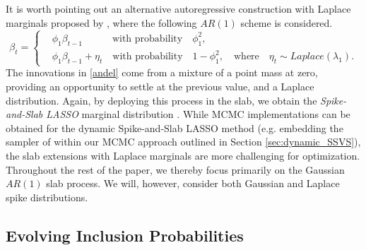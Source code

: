 \documentclass[ba]{imsart}
\numberwithin{equation}{section}
\theoremstyle{plain}
\def\C {\,|\:}
\def\C {\,|\:}
\begin{document}
It is worth pointing out an alternative autoregressive construction with Laplace marginals proposed  by \cite{andel}, {where  the following $AR(1)$ scheme is considered.}
\begin{equation}\label{andel}
\beta_t=\begin{cases}
&\phi_1\beta_{t-1} \quad \quad\quad\text{with probability}\quad \phi_1^2,\\
&\phi_1\beta_{t-1}+\eta_t\quad \text{with probability}\quad 1-\phi_1^2, \quad\text{where}\quad\eta_t\sim Laplace(\lambda_1).
\end{cases}
\end{equation}
The innovations in \eqref{andel} come from a mixture of a point mass at zero, providing an opportunity to settle at the previous value, and a Laplace distribution. Again, {by} deploying this process in  the slab, we  obtain the {\sl Spike-and-Slab LASSO} marginal distribution \citep{rockova15}.  While MCMC implementations can be obtained for the dynamic Spike-and-Slab LASSO method (e.g. embedding the sampler of \cite{kalli_griffin} within our MCMC approach outlined in Section \ref{sec:dynamic_SSVS}),
the  slab extensions with Laplace marginals are  more challenging for optimization. 
Throughout the rest of the paper, we thereby focus primarily on the Gaussian $AR(1)$ slab process. We will, however, consider both Gaussian and Laplace spike distributions.



\subsection{Evolving Inclusion Probabilities}\label{sec:weights}

\end{document}
